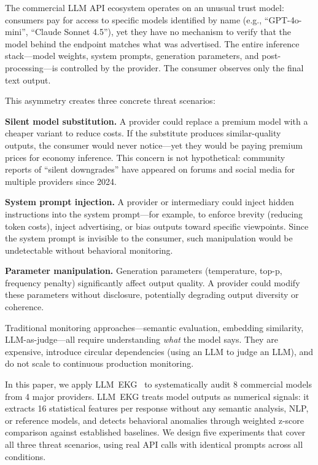 \documentclass[11pt,twocolumn]{article}
\begin{document}
The commercial LLM API ecosystem operates on an unusual trust model: consumers pay for access to specific models identified by name (e.g., ``GPT-4o-mini'', ``Claude Sonnet 4.5''), yet they have no mechanism to verify that the model behind the endpoint matches what was advertised.
The entire inference stack---model weights, system prompts, generation parameters, and post-processing---is controlled by the provider.
The consumer observes only the final text output.

This asymmetry creates three concrete threat scenarios:

\textbf{Silent model substitution.}
A provider could replace a premium model with a cheaper variant to reduce costs.
If the substitute produces similar-quality outputs, the consumer would never notice---yet they would be paying premium prices for economy inference.
This concern is not hypothetical: community reports of ``silent downgrades'' have appeared on forums and social media for multiple providers since 2024.

\textbf{System prompt injection.}
A provider or intermediary could inject hidden instructions into the system prompt---for example, to enforce brevity (reducing token costs), inject advertising, or bias outputs toward specific viewpoints.
Since the system prompt is invisible to the consumer, such manipulation would be undetectable without behavioral monitoring.

\textbf{Parameter manipulation.}
Generation parameters (temperature, top-p, frequency penalty) significantly affect output quality.
A provider could modify these parameters without disclosure, potentially degrading output diversity or coherence.

Traditional monitoring approaches---semantic evaluation, embedding similarity, LLM-as-judge---all require understanding \emph{what} the model says.
They are expensive, introduce circular dependencies (using an LLM to judge an LLM), and do not scale to continuous production monitoring.

In this paper, we apply LLM~EKG~\cite{esteban2026llmekg} to systematically audit 8 commercial models from 4 major providers.
LLM~EKG treats model outputs as numerical signals: it extracts 16 statistical features per response without any semantic analysis, NLP, or reference models, and detects behavioral anomalies through weighted z-score comparison against established baselines.
We design five experiments that cover all three threat scenarios, using real API calls with identical prompts across all conditions.
\end{document}
